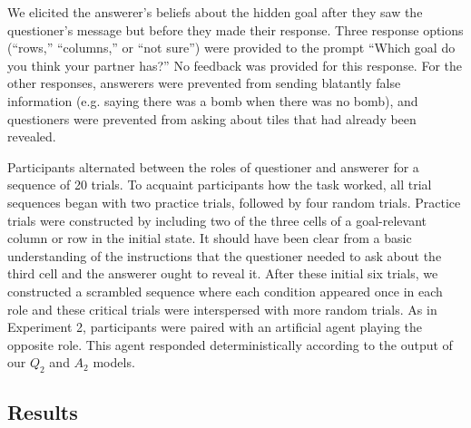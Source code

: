 \documentclass[12pt, floatsintext, jou]{apa6}
\begin{document}
We elicited the answerer's beliefs about the hidden goal after they saw the questioner's message but before they made their response.
Three response options (``rows,'' ``columns,'' or ``not sure'') were provided to the prompt ``Which goal do you think your partner has?'' 
No feedback was provided for this response.
For the other responses, answerers were prevented from sending blatantly false information (e.g. saying there was a bomb when there was no bomb), and questioners were prevented from asking about tiles that had already been revealed.

Participants alternated between the roles of questioner and answerer for a sequence of 20 trials. 
To acquaint participants how the task worked, all trial sequences began with two practice trials, followed by four random trials.
Practice trials were constructed by including two of the three cells of a goal-relevant column or row in the initial state. 
It should have been clear from a basic understanding of the instructions that the questioner needed to ask about the third cell and the answerer ought to reveal it. 
After these initial six trials, we constructed a scrambled sequence where each condition appeared once in each role and these critical trials were interspersed with more random trials.
As in Experiment 2, participants were paired with an artificial agent playing the opposite role. 
This agent responded deterministically according to the output of our $Q_2$ and $A_2$ models. 

\subsection{Results}
\end{document}
